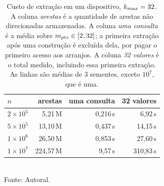 \begin{table}[htb!]
\caption{\label{tab:extract} Custo de extração em um dispositivo, $k_{max} = 32$. A coluna \textit{arestas} é a quantidade de arestas não direcionadas armazenadas. A coluna \textit{uma consulta} é a média sobre $m_{pts} \in [2, 32]$; a primeira extração após uma construção é excluída dela, por pagar o primeiro acesso aos arranjos. A coluna \textit{32 valores} é o total medido, incluindo essa primeira extração. As linhas são médias de 3 sementes, exceto $10^7$, que é uma.}
\centering
\footnotesize
\begin{tabular}{@{}lrrr@{}}
\toprule
$n$ & arestas & uma consulta & 32 valores \\
\midrule
$2\times10^5$ & 5,21\,M   & 0,216\,s & 6,92\,s   \\
$5\times10^5$ & 13,10\,M  & 0,437\,s & 14,15\,s  \\
$1\times10^6$ & 26,50\,M  & 0,853\,s & 27,60\,s  \\
$1\times10^7$ & 224,57\,M & 9,57\,s  & 310,83\,s \\
\bottomrule
\end{tabular}\\
Fonte: Autoral.
\end{table}

